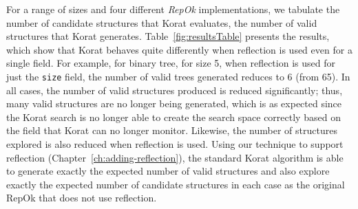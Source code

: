 For a range of sizes and four different \emph{RepOk} implementations,
we tabulate the number of candidate structures that Korat evaluates,
the number of valid structures that Korat generates.
Table~\ref{fig:resultsTable} presents the results, which show that
Korat behaves quite differently when reflection is used even for a
single field.  For example, for binary tree, for size 5, when
reflection is used for just the \texttt{size} field, the number of
valid trees generated reduces to 6 (from 65).  In all cases, the
number of valid structures produced is reduced significantly; thus,
many valid structures are no longer being generated, which is as
expected since the Korat search is no longer able to create the search
space correctly based on the field that Korat can no longer monitor.
Likewise, the number of structures explored is also reduced when
reflection is used.
Using our technique to support reflection
(Chapter~\ref{ch:adding-reflection}), the standard Korat algorithm is
able to generate exactly the expected number of valid structures and
also explore exactly the expected number of candidate structures in
each case as the original RepOk that does not use reflection.


